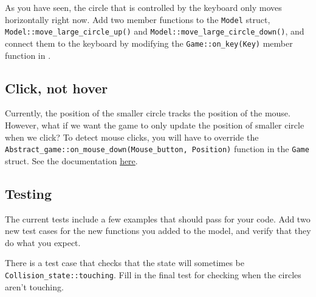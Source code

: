 \documentclass{tufte-handout}
\begin{document}
As you have seen, the circle that is controlled by the keyboard only
moves horizontally right now.
Add two member functions to the \verb!Model! struct,
\verb!Model::move_large_circle_up()! and
\verb!Model::move_large_circle_down()!, and connect them to the keyboard
by modifying the \verb!Game::on_key(Key)! member function in
.

\subsection{Click, not hover}

Currently, the position of the smaller circle tracks the position of the
mouse. However, what if we want the game to only update the position of
smaller circle when we click? To detect mouse clicks, you will have to
override the \verb!Abstract_game::on_mouse_down(Mouse_button, Position)!
function in the \verb!Game! struct. See the documentation
\href{https://tov.github.io/ge211/classge211_1_1_abstract__game.html\#a6d88b5777c0a08fe261bc39c0694dd4f}{here}.

\subsection{Testing}

The current tests include a few examples that should pass
for your code. Add two new test cases for the new functions you added to
the model, and verify that they do what you expect.

There is a test case that checks that the state will sometimes be
\verb!Collision_state::touching!. Fill in the final test for checking
when the circles aren't touching.
\end{document}
